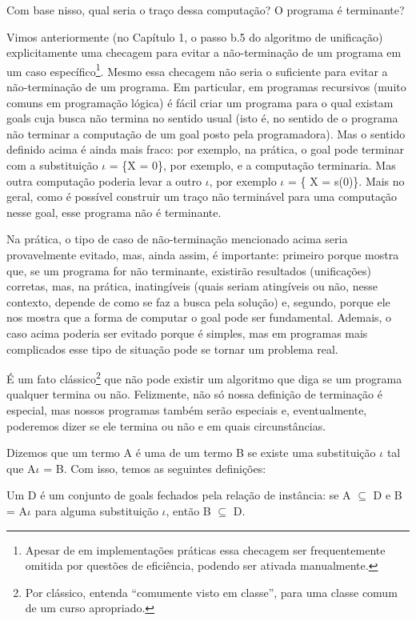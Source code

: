 Com base nisso, qual seria o traço dessa computação?  O programa é
terminante?

Vimos anteriormente (no Capítulo 1, o passo b.5 do algoritmo de
unificação) %
explicitamente uma checagem para evitar a não-terminação de um
programa em um caso específico\footnote{Apesar de em implementações
  práticas essa checagem ser frequentemente omitida por questões de eficiência,
  podendo ser ativada manualmente.}.  Mesmo essa checagem não seria o
suficiente para evitar a não-terminação de um programa.  Em
particular, em programas recursivos (muito comuns em programação
lógica) é fácil criar um programa para o qual existam goals cuja busca
não termina no sentido usual (isto é, no sentido de o programa não
terminar a computação de um goal posto pela programadora).  Mas o
sentido definido acima é ainda mais fraco: por exemplo, na prática, o
goal  pode terminar com a substituição $\iota$ =
\{X = 0\}, por exemplo, e a computação terminaria. Mas outra
computação poderia levar a outro $\iota$, por exemplo $\iota$ = \{ X =
s(0)\}. Mais no geral, como é possível construir um traço não
terminável para uma computação nesse goal, esse programa não é
terminante.

Na prática, o tipo de caso de não-terminação mencionado acima seria
provavelmente evitado, mas, ainda assim, é importante: primeiro porque
mostra que, se um programa for não terminante, existirão resultados
(unificações) corretas, mas, na prática, inatingíveis (quais seriam
atingíveis ou não, nesse contexto, depende de como se faz a busca pela
solução) e, segundo, porque ele nos mostra que a forma de computar o
goal pode ser fundamental. Ademais, o caso acima poderia ser evitado
porque é simples, mas em programas mais complicados esse tipo de
situação pode se tornar um problema real.

É um fato clássico\footnote{Por clássico, entenda ``comumente visto em
  classe'', para uma classe comum de um curso apropriado.} que não
pode existir um algoritmo que diga se um programa qualquer termina ou
não. Felizmente, não só nossa definição de terminação é especial, mas
nossos programas também serão especiais e, eventualmente, poderemos
dizer se ele termina ou não e em quais circunstâncias.

Dizemos que um termo A é uma  de um termo B se
existe uma substituição $\iota$ tal que A$\iota$ = B. Com isso, temos
as seguintes definições:

\begin{definition}
  Um  D é um conjunto de goals fechados pela
  relação de instância: se A $\subseteq$ D e B = A$\iota$ para alguma
  substituição $\iota$, então B $\subseteq$ D.
  \end{definition}


